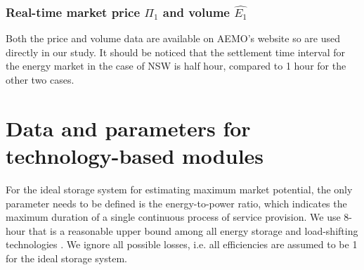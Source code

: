 \subsubsection{Real-time market price $\Pi_1$ and volume $\hat{E_1}$}

Both the price and volume data are available on AEMO's website so are used directly in our study. It should be noticed that the settlement time interval for the energy market in the case of NSW is half hour, compared to 1 hour for the other two cases.










\section[Data and parameters for technology-based modules]{Data and parameters for technology-based modules%
	}
\label{app:tech}

For the ideal storage system for estimating maximum market potential, the only parameter needs to be defined is the energy-to-power ratio, which indicates the maximum duration of a single continuous process of service provision. We use 8-hour that is a reasonable upper bound among all energy storage and load-shifting technologies \cite{Muller2016}. We ignore all possible losses, i.e. all efficiencies are assumed to be 1 for the ideal storage system.

